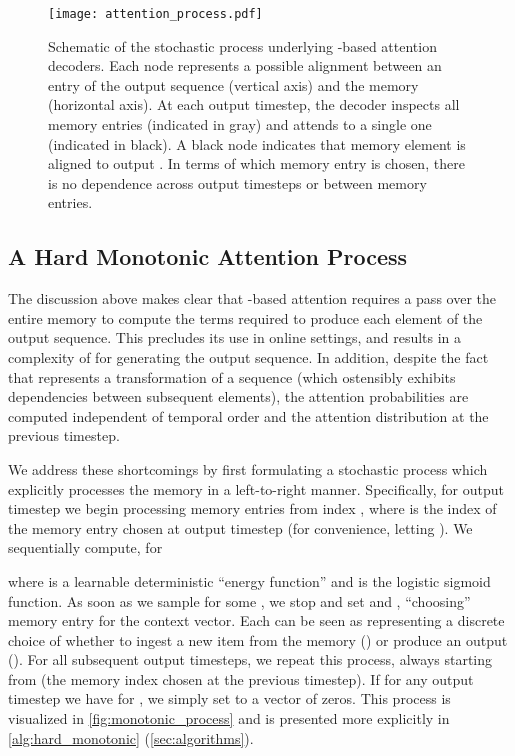 \documentclass{article}
\begin{document}
\begin{figure}[t]
\vskip 0.2in
\begin{center}
\centerline{\texttt{[image: attention\_process.pdf]}}
\caption{Schematic of the stochastic process underlying -based attention decoders.
Each node represents a possible alignment between an entry of the output sequence (vertical axis) and the memory (horizontal axis).
At each output timestep, the decoder inspects all memory entries (indicated in gray) and attends to a single one (indicated in black).
A black node indicates that memory element  is aligned to output .
In terms of which memory entry is chosen, there is no dependence across output timesteps or between memory entries.}
\label{fig:attention_process}
\end{center}
\vskip -0.2in
\end{figure}

\subsection{A Hard Monotonic Attention Process}
\label{sec:online_process}

The discussion above makes clear that -based attention requires a pass over the entire memory to compute the terms  required to produce each element of the output sequence.
This precludes its use in online settings, and results in a complexity of  for generating the output sequence.
In addition, despite the fact that  represents a transformation of a sequence (which ostensibly exhibits dependencies between subsequent elements), the attention probabilities are computed independent of temporal order and the attention distribution at the previous timestep.

We address these shortcomings by first formulating a stochastic process which explicitly processes the memory in a left-to-right manner.
Specifically, for output timestep  we begin processing memory entries from index , where  is the index of the memory entry chosen at output timestep  (for convenience, letting ).
We sequentially compute, for 

where  is a learnable deterministic ``energy function'' and  is the logistic sigmoid function.
As soon as we sample  for some , we stop and set  and , ``choosing'' memory entry  for the context vector.
Each  can be seen as representing a discrete choice of whether to ingest a new item from the memory () or produce an output ().
For all subsequent output timesteps, we repeat this process, always starting from  (the memory index chosen at the previous timestep).
If for any output timestep  we have  for , we simply set  to a vector of zeros.
This process is visualized in \cref{fig:monotonic_process} and is presented more explicitly in \cref{alg:hard_monotonic} (\cref{sec:algorithms}).
\end{document}

